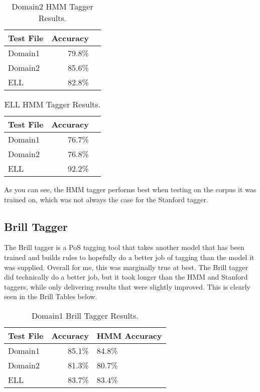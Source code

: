 \documentclass[11pt,a4paper]{article}
\begin{document}
\begin{table}[h]
  \begin{center}
  \begin{tabular}{|l|rl|}
  \hline \bf Test File & \bf Accuracy \\ \hline
  Domain1 & 79.8\% \\
  Domain2 & 85.6\%  \\
  ELL  & 82.8\%  \\
  \hline
  \end{tabular}
  \end{center}
  \caption{\label{d2HMM-table} Domain2 HMM Tagger Results. }
\end{table}

\begin{table}[h]
  \begin{center}
  \begin{tabular}{|l|rl|}
  \hline \bf Test File & \bf Accuracy \\ \hline
  Domain1 & 76.7\% \\
  Domain2 & 76.8\%  \\
  ELL  & 92.2\%  \\
  \hline
  \end{tabular}
  \end{center}
  \caption{\label{ellHMM-table} ELL HMM Tagger Results. }
\end{table}

As you can see, the HMM tagger performs best when testing on the corpus it was
trained on, which was not always the case for the Stanford tagger.

\subsection{Brill Tagger}

The Brill tagger is a PoS tagging tool that takes another model that has been
trained and builds rules to hopefully do a better job of tagging than the model
it was supplied. Overall for me, this was marginally true at best. The Brill tagger
did technically do a better job, but it took longer than the HMM and Stanford
taggers, while only delivering results that were slightly improved. This is clearly
seen in the Brill Tables below.

\begin{table}[h]
  \begin{center}
  \begin{tabular}{|l|rl|}
  \hline \bf Test File & \bf Accuracy & \bf HMM Accuracy \\ \hline
  Domain1 & 85.1\% & 84.8\% \\
  Domain2 & 81.3\% & 80.7\% \\
  ELL  & 83.7\% & 83.4\%  \\
  \hline
  \end{tabular}
  \end{center}
  \caption{\label{d1Br-table} Domain1 Brill Tagger Results. }
\end{table}
\end{document}
